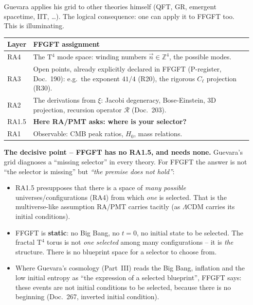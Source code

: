 Guevara applies his grid to other theories himself (QFT, GR, emergent
spacetime, IIT, \ldots). The logical consequence: one can apply it to
FFGFT too. This is illuminating.

\begin{center}
\begin{tabular}{p{2.2cm}p{9.5cm}}
\toprule
\textbf{Layer} & \textbf{FFGFT assignment} \\
\midrule
RA4 & The T$^4$ mode space: winding numbers $\vec{n}\in\mathbb{Z}^4$,
      the possible modes. \\
\addlinespace
RA3 & Open points, already explicitly declared in FFGFT
      (P-register, Doc.~190): e.g.\ the exponent $41/4$ (R20),
      the rigorous $C_\ell$ projection (R30). \\
\addlinespace
RA2 & The derivations from $\xi$: Jacobi degeneracy, Bose-Einstein,
      3D projection, recursion operator $\mathcal{R}$ (Doc.~203). \\
\addlinespace
RA1.5 & \textbf{Here RA/PMT asks: where is your selector?} \\
\addlinespace
RA1 & Observable: CMB peak ratios, $H_0$, mass relations. \\
\bottomrule
\end{tabular}
\end{center}

\textbf{The decisive point -- FFGFT has no RA1.5, and needs none.}
Guevara's grid diagnoses a ``missing selector'' in every theory. For
FFGFT the answer is not ``the selector is missing'' but \emph{``the
premise does not hold''}:

\begin{itemize}
  \item RA1.5 presupposes that there is a space of \emph{many possible}
        universes/configurations (RA4) from which \emph{one} is selected.
        That is the multiverse-like assumption RA/PMT carries tacitly
        (as $\Lambda$CDM carries its initial conditions).
  \item FFGFT is \textbf{static}: no Big Bang, no $t=0$, no initial state
        to be selected. The fractal T$^4$ torus is not \emph{one selected}
        among many configurations -- it is \emph{the} structure. There is
        no blueprint space for a selector to choose from.
  \item Where Guevara's cosmology (Part~III) reads the Big Bang,
        inflation and the low initial entropy as ``the expression of a
        selected blueprint'', FFGFT says: these events are not initial
        conditions to be selected, because there is no beginning
        (Doc.~267, inverted initial condition).
\end{itemize}

